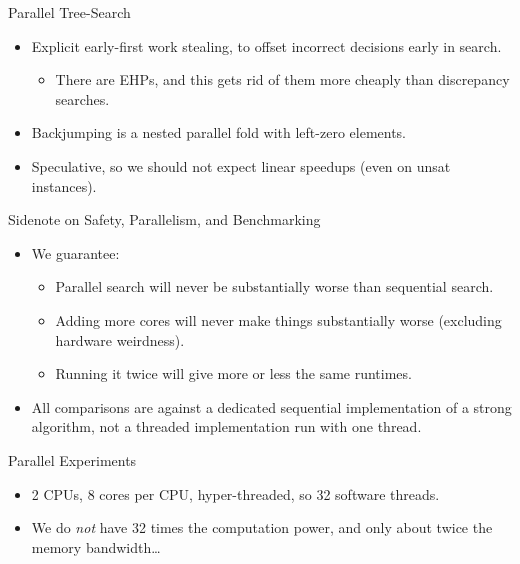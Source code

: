 \documentclass{beamer}
\begin{document}
\begin{frame}{Parallel Tree-Search}
     {
        \begin{itemize}
            \item Explicit early-first work stealing, to offset incorrect decisions early in search.
                \begin{itemize}
                    \item There are EHPs, and this gets rid of them more cheaply than discrepancy
                        searches.
                \end{itemize}
            \item Backjumping is a nested parallel fold with left-zero elements.
            \item Speculative, so we should not expect linear speedups (even on unsat instances).
        \end{itemize}
    }
\end{frame}

\begin{frame}{Sidenote on Safety, Parallelism, and Benchmarking}
    \begin{itemize}
        \item We guarantee:
            \begin{itemize}
                \item Parallel search will never be substantially worse than sequential search.
                \item Adding more cores will never make things substantially worse (excluding
                    hardware weirdness).
                \item Running it twice will give more or less the same runtimes.
            \end{itemize}
        \item All comparisons are against a dedicated sequential implementation of a strong
            algorithm, not a threaded implementation run with one thread.
    \end{itemize}
\end{frame}

\begin{frame}{Parallel Experiments}
    \begin{itemize}
        \item 2 CPUs, 8 cores per CPU, hyper-threaded, so 32 software threads.
        \item We do \emph{not} have 32 times the computation power, and only about twice the memory
            bandwidth\ldots
    \end{itemize}
\end{frame}
\end{document}
